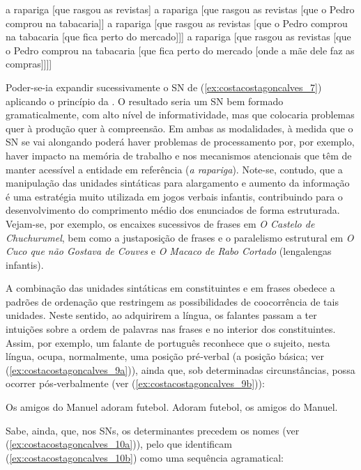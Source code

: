 \documentclass[output=paper]{LSP/langsci}
\begin{document}
\ea\label{ex:costacostagoncalves_8}
\ea\label{ex:costacostagoncalves_8a} a rapariga [que rasgou as revistas]
\ex\label{ex:costacostagoncalves_8b} a rapariga [que rasgou as revistas [que o Pedro comprou na tabacaria]]
\ex\label{ex:costacostagoncalves_8c} a rapariga [que rasgou as revistas [que o Pedro comprou na tabacaria [que fica perto do mercado]]]
\ex\label{ex:costacostagoncalves_8d} a rapariga [que rasgou as revistas [que o Pedro comprou na tabacaria [que fica perto do mercado [onde a mãe dele faz as compras]]]]
\zl

Poder-se-ia expandir sucessivamente o SN de (\ref{ex:costacostagoncalves_7}) aplicando o princípio da . O resultado seria um SN bem formado gramaticalmente, com alto nível de informatividade, mas que colocaria problemas quer à produção quer à compreensão. Em ambas as modalidades, à medida que o SN se vai alongando poderá haver problemas de processamento por, por exemplo, haver impacto na memória de trabalho e nos mecanismos atencionais que têm de manter acessível a entidade em referência (\textit{a rapariga}). Note-se, contudo, que a manipulação das unidades sintáticas para alargamento e aumento da informação é uma estratégia muito utilizada em jogos verbais infantis, contribuindo para o desenvolvimento do comprimento médio dos enunciados de forma estruturada. Vejam-se, por exemplo, os encaixes sucessivos de frases  em \textit{O Castelo de Chuchurumel}, bem como a justaposição de frases e o paralelismo estrutural em \textit{O Cuco que não Gostava de Couves} e \textit{O Macaco de Rabo Cortado} (lengalengas infantis). 

A combinação das unidades sintáticas em constituintes e em frases obedece a padrões de ordenação que restringem as possibilidades de coocorrência de tais unidades. Neste sentido, ao adquirirem a língua, os falantes passam a ter intuições sobre a ordem de palavras nas frases e no interior dos constituintes. Assim, por exemplo, um falante de português reconhece que o sujeito, nesta língua, ocupa, normalmente, uma posição pré‑verbal (a posição básica; ver (\ref{ex:costacostagoncalves_9a})), ainda que, sob determinadas circunstâncias, possa ocorrer pós‑verbalmente (ver (\ref{ex:costacostagoncalves_9b})):

\ea\label{ex:costacostagoncalves_9}
\ea\label{ex:costacostagoncalves_9a} Os amigos do Manuel adoram futebol.
\ex\label{ex:costacostagoncalves_9b} Adoram futebol, os amigos do Manuel.
\zl

Sabe, ainda, que, nos SNs, os determinantes precedem os nomes (ver (\ref{ex:costacostagoncalves_10a})), pelo que identificam (\ref{ex:costacostagoncalves_10b}) como uma sequência agramatical:
\ea\label{ex:costacostagoncalves_10}
\zl
\end{document}
